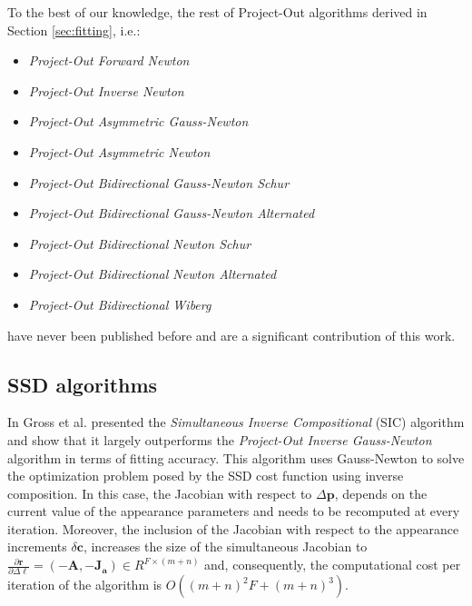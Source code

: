 To the best of our knowledge, the rest of Project-Out algorithms derived in Section \ref{sec:fitting}, i.e.:
\begin{itemize}
\item \emph{Project-Out Forward Newton}
\item \emph{Project-Out Inverse Newton}
\item \emph{Project-Out Asymmetric Gauss-Newton}
\item \emph{Project-Out Asymmetric Newton}
\item \emph{Project-Out Bidirectional Gauss-Newton Schur}
\item \emph{Project-Out Bidirectional Gauss-Newton Alternated}
\item \emph{Project-Out Bidirectional Newton Schur}
\item \emph{Project-Out Bidirectional Newton Alternated}
\item \emph{Project-Out Bidirectional Wiberg}
\end{itemize}
have never been published before and are a significant contribution of this work.

\subsection{SSD algorithms}

In \cite{Gross2005} Gross et al. presented the \emph{Simultaneous Inverse Compositional} (SIC) algorithm and show that it largely outperforms the \emph{Project-Out Inverse Gauss-Newton} algorithm in terms of fitting accuracy. This algorithm uses Gauss-Newton to solve the optimization problem posed by the SSD cost function using inverse composition. In this case, the Jacobian with respect to $\Delta\mathbf{p}$, depends on the current value of the appearance parameters and needs to be recomputed at every iteration. Moreover, the inclusion of the Jacobian with respect to the appearance increments $\delta\mathbf{c}$, increases the size of the simultaneous Jacobian to $\frac{\partial\mathbf{r}}{\partial\Delta\boldsymbol{\ell}} = \left( -\mathbf{A}, -\mathbf{J}_\mathbf{a} \right) \in R^{F \times (m + n)}$ and, consequently, the computational cost per iteration of the algorithm is $O((m + n)^2F + (m + n)^3)$.

